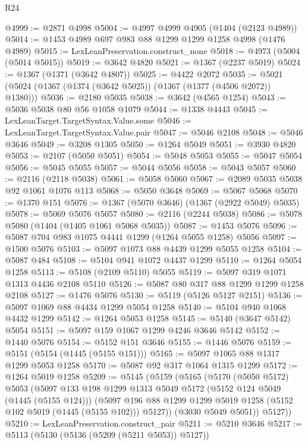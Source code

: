 \begin{lexlean}{R24}
\begin{coremodule}
@4999 := @2871 @4998
@5004 := @4997 @4999 @4905 (@1404 (@2123 @4989))
@5014 := @1453 @4989 @697 @983 @88 @1299 @1299 @1258 @4998 (@1476 @4989)
@5015 := LexLeanPreservation.construct_none
@5018 := @4973 (@5004 (@5014 @5015))
@5019 := @3642 @4820
@5021 := @1367 (@2237 @5019)
@5024 := @1367 (@1371 (@3642 @4807))
@5025 := @4422 @2072
@5035 := @5021 (@5024 (@1367 (@1374 (@3642 @5025)) (@1367 (@1377 (@4506 @2072)) @1380)))
@5036 := @2180 @5035
@5038 := @3642 (@4565 @1254)
@5043 := @5036 @5038 @80 @56 @1058 @1079
@5044 := @1338 @4443
@5045 := LexLeanTarget.TargetSyntax.Value.some
@5046 := LexLeanTarget.TargetSyntax.Value.pair
@5047 := @5046 @2108
@5048 := @5046 @3646
@5049 := @3208 @1305
@5050 := @1264 @5049
@5051 := @3930 @4820
@5053 := @2107 (@5050 @5051)
@5054 := @5048 @5053
@5055 := @5047 @5054
@5056 := @5045 @5055
@5057 := @5044 @5056
@5058 := @5043 @5057
@5060 := @2116 (@2118 @5038)
@5061 := @5058 @5060
@5067 := @2089 @5035 @5038 @92 @1061 @1076 @113
@5068 := @5050 @3648
@5069 := @5067 @5068
@5070 := @1370 @151
@5076 := @1367 (@5070 @3646) (@1367 (@2922 @5049) @5035)
@5078 := @5069 @5076 @5057
@5080 := @2116 (@2244 @5038)
@5086 := @5078 @5080 (@1404 (@1405 @1061 @5068 @5035))
@5087 := @1453 @5076
@5096 := @5087 @704 @983 @1075 @4441 @1299 (@1264 @5055 @1258) @5056
@5097 := @1500 @5076
@5103 := @5097 @1073 @88 @4439 @1299 @5055 @1258
@5104 := @5087 @484
@5108 := @5104 @941 @1072 @4437 @1299
@5110 := @1264 @5054 @1258
@5113 := @5108 (@2109 @5110) @5055
@5119 := @5097 @319 @1071 @1313 @4436 @2108 @5110
@5126 := @5087 @80 @317 @88 @1299 @1299 @1258 @2108
@5127 := @1476 @5076
@5130 := @5119 (@5126 @5127 @2151)
@5136 := @5097 @1069 @88 @4434 @1299 @5054 @1258
@5140 := @5104 @940 @1068 @4432 @1299
@5142 := @1264 @5053 @1258
@5145 := @5140 (@3647 @5142) @5054
@5151 := @5097 @159 @1067 @1299 @4246 @3646 @5142
@5152 := @1440 @5076
@5154 := @5152 @151 @3646
@5155 := @1446 @5076
@5159 := @5151 (@5154 (@1445 (@5155 @151)))
@5165 := @5097 @1065 @88 @1317 @1299 @5053 @1258
@5170 := @5087 @92 @317 @1064 @1315 @1299
@5172 := @1264 @5019 @1258
@5209 := @5145
    (@5159
      (@5165
        (@5170
          (@5050 @5172)
          @5053
          (@5097
            @133
            @198
            @1299
            @1313
            @5049
            @5172
            (@5152 @124 @5049 (@1445 (@5155 @124)))
            (@5097 @196 @88 @1299 @1299 @5019 @1258 (@5152 @102 @5019 (@1445 (@5155 @102))) @5127))
          (@3030 @5049 @5051))
        @5127))
@5210 := LexLeanPreservation.construct_pair
@5211 := @5210 @3646
@5217 := @5113 (@5130 (@5136 (@5209 (@5211 @5053)) @5127))

\end{coremodule}
\end{lexlean}

